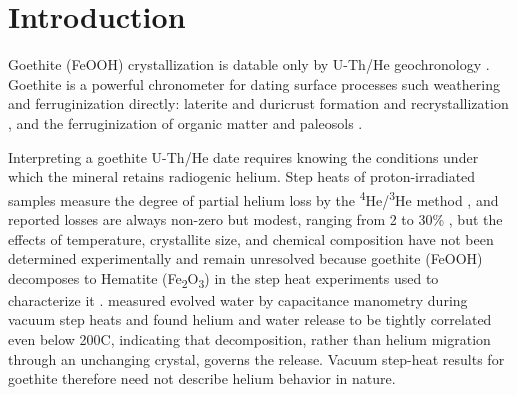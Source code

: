 
\providecommand{\tophline}{\toprule}
\providecommand{\middlehline}{\midrule}
\providecommand{\bottomhline}{\bottomrule}

\section{Introduction}\label{sec:introduction}

Goethite (FeOOH) crystallization is datable only by U-Th/He geochronology \citep{shustervasconcelos2005,farley2024}. Goethite is a powerful chronometer for dating surface processes such weathering and ferruginization directly: laterite and duricrust formation and recrystallization \citep{monteiro2014,allard2018,ansart2022}, and the ferruginization of organic matter and paleosols \citep{heim2006,yappshuster2011,vasconcelos2013,danisik2013,hofmann2017}. 

Interpreting a goethite U-Th/He date requires knowing the conditions under which the mineral retains radiogenic helium. Step heats of proton-irradiated samples measure the degree of partial helium loss by the \textsuperscript{4}He/\textsuperscript{3}He method \citep{shustervasconcelos2005}, and reported losses are always non-zero but modest, ranging from 2 to 30\% \citep{shustervasconcelos2005,heim2006,hofmann2017,deng2017}, but the effects of temperature, crystallite size, and chemical composition have not been determined experimentally and remain unresolved because goethite (FeOOH) decomposes to Hematite (Fe\textsubscript{2}O\textsubscript{3}) in the step heat experiments used to characterize it \citep{farley2024}. \citet{farley2024} measured evolved water by capacitance manometry during vacuum step heats and found helium and water release to be tightly correlated even below 200\textdegree C, indicating that decomposition, rather than helium migration through an unchanging crystal, governs the release. Vacuum step-heat results for goethite therefore need not describe helium behavior in nature.

